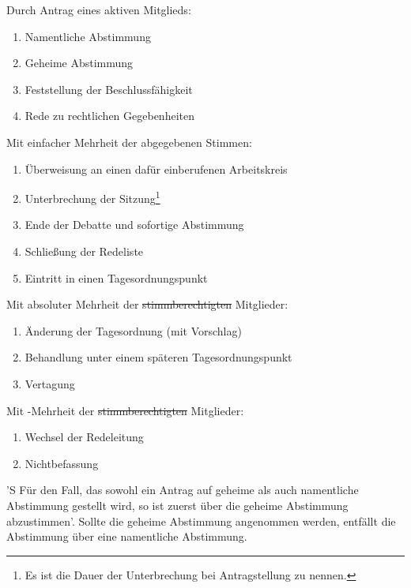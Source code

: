 \documentclass[%
	parskip=half,
]{scrartcl}
\newcounter{enumitem}
\newcommand{\edit}[1]{{\color{red} #1}}
\newcommand{\add}[1]{{\color{blue} #1}}
\newcommand{\new}[1]{{\color{orange} #1}}
\newcommand{\delete}[1]{{\color{red} \sout{#1}}}
\begin{document}
\begin{contract}
Durch Antrag eines \new{aktiven} Mitglieds:
\begin{enumerate}[\qquad a)]
	\item Namentliche Abstimmung
	\item Geheime Abstimmung
	\item Feststellung der Beschlussfähigkeit
	\item Rede zu rechtlichen Gegebenheiten
	\setcounter{enumitem}{\value{enumi}}
\end{enumerate}

Mit einfacher Mehrheit der abgegebenen Stimmen:
\begin{enumerate}[\qquad a)]
	\setcounter{enumi}{\value{enumitem}}
	\item Überweisung \edit{an einen dafür einberufenen Arbeitskreis}
	\item Unterbrechung der Sitzung\footnote{\add{Es ist die Dauer der Unterbrechung bei Antragstellung zu nennen.}}
	\item Ende der Debatte und sofortige Abstimmung
	\item \edit{Schließung der Redeliste}
	\item Eintritt in einen Tagesordnungspunkt
	\setcounter{enumitem}{\value{enumi}}
\end{enumerate}

Mit absoluter Mehrheit der \delete{stimmberechtigten} Mitglieder:
\begin{enumerate}[\qquad a)]
	\setcounter{enumi}{\value{enumitem}}
	\item Änderung der Tagesordnung (mit Vorschlag)
	\item Behandlung unter einem späteren Tagesordnungspunkt
	\item Vertagung
	\setcounter{enumitem}{\value{enumi}}
\end{enumerate}

Mit -Mehrheit der \delete{stimmberechtigten} Mitglieder:
\begin{enumerate}[\qquad a)]
	\setcounter{enumi}{\value{enumitem}}
	\item Wechsel der \edit{Redeleitung}
	\item Nichtbefassung
\end{enumerate}


'S Für den Fall, das sowohl ein Antrag auf geheime als auch namentliche Abstimmung gestellt wird, \edit{so ist} zuerst 
über die geheime Abstimmung \edit{abzustimmen}'. Sollte die geheime Abstimmung angenommen werden, entfällt \edit{die} 
Abstimmung über eine namentliche Abstimmung.


\end{contract}
\end{document}
